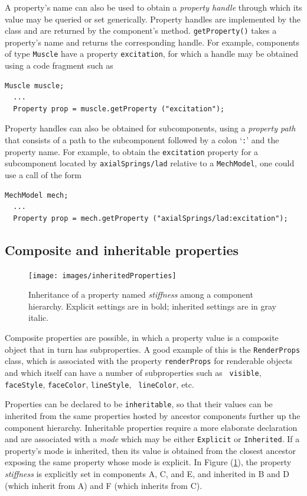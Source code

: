 A property's name can also be used to obtain a {\it
property handle} through which its value may be queried or
set generically. Property handles are implemented by
the class  and are returned by
the component's
 method.
{\tt getProperty()} takes a property's name and returns the
corresponding handle. For example, components of type {\tt Muscle}
have a property {\tt excitation}, for which a handle
may be obtained using a code fragment such as
\begin{lstlisting}[]
  Muscle muscle; 
  ...
  Property prop = muscle.getProperty ("excitation");
\end{lstlisting}
Property handles can also be obtained for
subcomponents, using a {\it property path} that consists
of a path to the subcomponent followed by a colon
`{\tt :}' and the property name. For example,
to obtain the {\tt excitation} property for a subcomponent
located by {\tt axialSprings/lad} relative to a {\tt MechModel},
one could use a call of the form
\begin{lstlisting}[]
  MechModel mech;
  ...
  Property prop = mech.getProperty ("axialSprings/lad:excitation");
\end{lstlisting}

\subsection{Composite and inheritable properties}
\label{CompositeInheritableProperties:sec}

\begin{figure}[t]
\begin{center}
 \texttt{[image: images/inheritedProperties]}
\end{center}
\caption{Inheritance of a property named {\it stiffness} among
a component hierarchy. Explicit settings are in bold; inherited settings
are in gray italic.}
\label{inheritedProperties:fig}
\end{figure}

Composite properties are possible, in which a property value is a
composite object that in turn has subproperties. A good example of
this is the {\tt RenderProps} class, which is
associated with the property {\tt renderProps} for renderable objects
and which itself can have a number of subproperties such as {\tt
visible}, {\tt faceStyle}, {\tt faceColor}, {\tt lineStyle}, {\tt
lineColor}, etc.

Properties can be declared to be {\tt inheritable}, so that their
values can be inherited from the same properties hosted by ancestor
components further up the component hierarchy. Inheritable properties
require a more elaborate declaration and are associated with a {\it
mode} which may be either {\tt Explicit} or {\tt Inherited}.  If a
property's mode is inherited, then its value is obtained from
the closest ancestor exposing the same property whose mode is
explicit. In Figure (\ref{inheritedProperties:fig}), the property {\it
stiffness} is explicitly set in components A, C, and E, and inherited
in B and D (which inherit from A) and F (which inherits from C).

